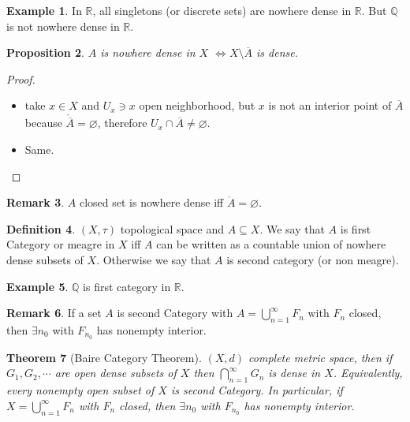 \documentclass[11pt,a4paper]{article}
\theoremstyle{definition}
\newtheorem{definition}{Definition}[section]
\newtheorem{example}[definition]{Example}
\newtheorem{remark}[definition]{Remark}
\theoremstyle{plain}
\newtheorem{theorem}[definition]{Theorem}
\newtheorem{proposition}[definition]{Proposition}
\theoremstyle{remark}
\newcommand{\R}{\mathbb{R}}
\newcommand{\Q}{\mathbb{Q}}
\newcommand{\1}{\mathbbm{1}}
\begin{document}
\begin{example}
    In $\R$, all singletons (or discrete sets) are nowhere dense in $\R$. But $\Q$ is not nowhere dense in $\R$.
\end{example}

\begin{proposition}
    $A$ is nowhere dense in $X$ $\iff X \setminus \overline{A}$ is dense. 
\end{proposition}

\begin{proof}
    \begin{itemize}
        \item[$\implies$] take $x \in X$ and $U_x \ni x$ open neighborhood, but $x$ is not an interior point of $\overline{A}$ because $\mathring{\overline{A}} = \varnothing$, therefore $U_x \cap \overline{A} \ne \varnothing$. 
        \item[$\impliedby$] Same. 
    \end{itemize}
\end{proof}


\begin{remark}
    $A$ closed set is nowhere dense iff $\mathring{A} = \varnothing$.   
\end{remark}

\begin{definition}
    $(X, \tau)$ topological space and $A \subseteq X$. We say that $A$ is first Category or meagre in $X$ iff $A$ can be written as a countable union of nowhere dense subsets of $X$.
    Otherwise we say that $A$ is second category (or non meagre).
\end{definition}

\begin{example}
    $\Q$ is first category in $\R$. 
\end{example}

\begin{remark}
    If a set $A$ is second Category with $A = \bigcup_{n=1}^\infty F_n$ with $F_n$ closed, then $\exists n_0$ with $F_{n_0}$ has nonempty interior. 
\end{remark}

\begin{theorem}[Baire Category Theorem]
    $(X, d)$ complete metric space, then if $G_1, G_2, \cdots$ are open dense subsets of $X$ then $\bigcap_{n=1}^\infty G_n$ is dense in $X$.
    Equivalently, every nonempty open subset of $X$ is second Category. In particular, if $X = \bigcup_{n=1}^\infty F_n$ with $F_n$ closed, then $\exists n_0$ with $F_{n_0}$ has nonempty interior.
\end{theorem}
\end{document}
